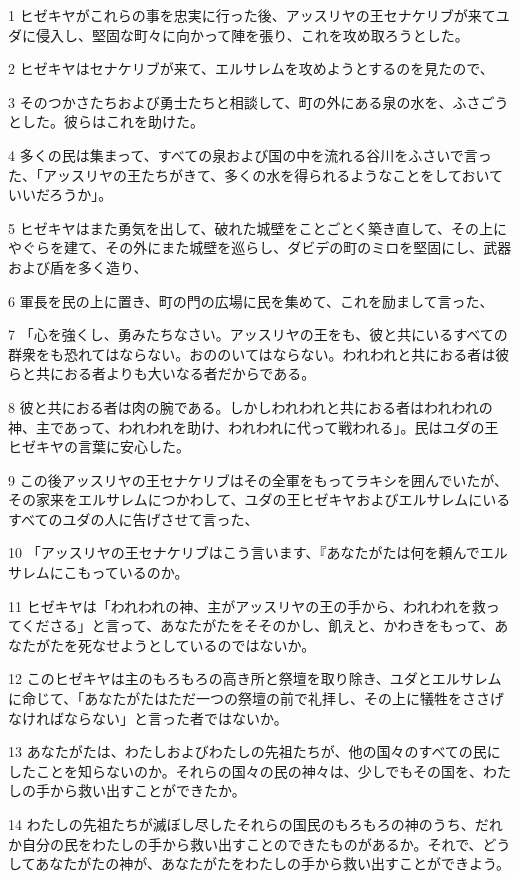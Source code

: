 \par 1 ヒゼキヤがこれらの事を忠実に行った後、アッスリヤの王セナケリブが来てユダに侵入し、堅固な町々に向かって陣を張り、これを攻め取ろうとした。
\par 2 ヒゼキヤはセナケリブが来て、エルサレムを攻めようとするのを見たので、
\par 3 そのつかさたちおよび勇士たちと相談して、町の外にある泉の水を、ふさごうとした。彼らはこれを助けた。
\par 4 多くの民は集まって、すべての泉および国の中を流れる谷川をふさいで言った、「アッスリヤの王たちがきて、多くの水を得られるようなことをしておいていいだろうか」。
\par 5 ヒゼキヤはまた勇気を出して、破れた城壁をことごとく築き直して、その上にやぐらを建て、その外にまた城壁を巡らし、ダビデの町のミロを堅固にし、武器および盾を多く造り、
\par 6 軍長を民の上に置き、町の門の広場に民を集めて、これを励まして言った、
\par 7 「心を強くし、勇みたちなさい。アッスリヤの王をも、彼と共にいるすべての群衆をも恐れてはならない。おののいてはならない。われわれと共におる者は彼らと共におる者よりも大いなる者だからである。
\par 8 彼と共におる者は肉の腕である。しかしわれわれと共におる者はわれわれの神、主であって、われわれを助け、われわれに代って戦われる」。民はユダの王ヒゼキヤの言葉に安心した。
\par 9 この後アッスリヤの王セナケリブはその全軍をもってラキシを囲んでいたが、その家来をエルサレムにつかわして、ユダの王ヒゼキヤおよびエルサレムにいるすべてのユダの人に告げさせて言った、
\par 10 「アッスリヤの王セナケリブはこう言います、『あなたがたは何を頼んでエルサレムにこもっているのか。
\par 11 ヒゼキヤは「われわれの神、主がアッスリヤの王の手から、われわれを救ってくださる」と言って、あなたがたをそそのかし、飢えと、かわきをもって、あなたがたを死なせようとしているのではないか。
\par 12 このヒゼキヤは主のもろもろの高き所と祭壇を取り除き、ユダとエルサレムに命じて、「あなたがたはただ一つの祭壇の前で礼拝し、その上に犠牲をささげなければならない」と言った者ではないか。
\par 13 あなたがたは、わたしおよびわたしの先祖たちが、他の国々のすべての民にしたことを知らないのか。それらの国々の民の神々は、少しでもその国を、わたしの手から救い出すことができたか。
\par 14 わたしの先祖たちが滅ぼし尽したそれらの国民のもろもろの神のうち、だれか自分の民をわたしの手から救い出すことのできたものがあるか。それで、どうしてあなたがたの神が、あなたがたをわたしの手から救い出すことができよう。

